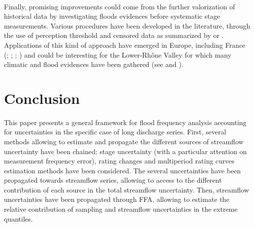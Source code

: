 \documentclass[11pt]{article}
\begin{document}
    \paragraph{}
    Finally, promising improvements could come from the further valorization of historical data by investigating floods evidences before systematic stage measurements. Various procedures have been developed in the literature, through the use of perception threshold and censored data as summarized by \citet{kjeldsen_documentary_2014} or \citet{brazdil_historical_2006}. Applications of this kind of approach have emerged in Europe, including France (\citet{naulet_flood_2005}; \citet{lang_extrapolation_2010}; \citet{neppel_flood_2010}; \citet{payrastre_usefulness_2011}) and could be interesting for the Lower-Rhône Valley for which many climatic and flood evidences have been gathered (see \citet{pichard_sept_2014} and \citet{pichard_hydro-climatology_2017}).
    
    
\section{Conclusion}
    \paragraph{}
    This paper presents a general framework for flood frequency analysis accounting for uncertainties in the specific case of long discharge series. First, several methods allowing to estimate and propagate the different sources of streamflow uncertainty have been chained: stage uncertainty (with a particular attention on measurement frequency error), rating changes and multiperiod rating curves estimation methods have been considered. The several uncertainties have been propagated towards streamflow series, allowing to access to the different contribution of each source in the total streamflow uncertainty. Then, streamflow uncertainties have been propagated through FFA, allowing to estimate the relative contribution of sampling and streamflow uncertainties in the extreme quantiles. 
\end{document}
